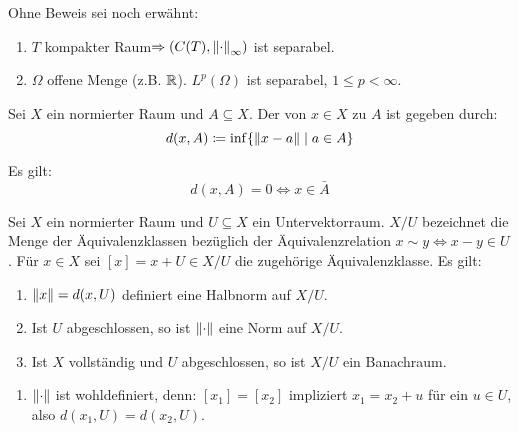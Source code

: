 \begin{bemerkung*}
	Ohne Beweis sei noch erw\"ahnt:
	\begin{enumerate}
		\item $ T $ kompakter Raum$ \Rightarrow(C(T),\left\|\cdot\right\|_\infty) $ ist separabel.
		\item $ \Omega $ offene Menge (z.B. $ \mathbb{R} $). $ L^p(\Omega) $ ist separabel, $ 1\leq p<\infty $.
	\end{enumerate}
\end{bemerkung*}
\begin{definition}
	Sei $ X $ ein normierter Raum und $ A\subseteq X $. Der   von $ x\in X $ zu $ A $ ist gegeben durch:
	\[ d(x,A)\coloneqq\inf\lbrace\left\|x-a\right\|\mid a\in A\rbrace \]
\end{definition}
\begin{bemerkung*}
 Es gilt: \[ d(x,A)=0\Leftrightarrow x\in\bar A \]
\end{bemerkung*}
\begin{satz}
	Sei $ X $ ein normierter Raum und $ U\subseteq X $ ein Untervektorraum. $ X/U $ bezeichnet die Menge der \"Aquivalenzklassen bez\"uglich der \"Aquivalenzrelation $ x\sim y\Leftrightarrow x-y\in U $. F\"ur $ x\in X $ sei $ [x]=x+U\in X/U $ die zugeh\"orige \"Aquivalenzklasse. Es gilt:
	\begin{enumerate}
		\item $ \left\|x\right\|=d(x,U) $ definiert eine Halbnorm auf $ X/U $.
		\item Ist $ U $ abgeschlossen, so ist $ \left\|\cdot\right\| $ eine Norm auf $ X/U $.
		\item Ist $ X $ vollst\"andig und $ U $ abgeschlossen, so ist $ X/U $ ein Banachraum.
	\end{enumerate}
\end{satz}
\begin{beweis}
	\begin{enumerate}
		\item $ \left\|\cdot\right\| $ ist wohldefiniert, denn: $ [x_1]=[x_2] $ impliziert $ x_1=x_2+u $ f\"ur ein $ u\in U $, also $ d(x_1,U)=d(x_2,U) $.
	\end{enumerate}
\end{beweis}